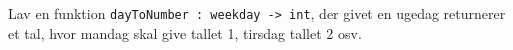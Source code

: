 Lav en funktion \texttt{dayToNumber : weekday -> int}, der givet
  en ugedag returnerer et tal, hvor mandag skal give tallet 1, tirsdag
  tallet 2 osv.
